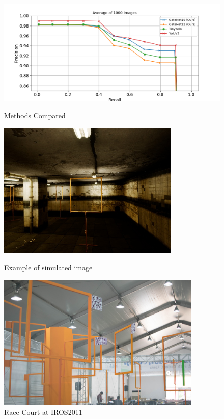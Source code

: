 \documentclass{beamer}
\begin{document}
\begin{frame}[fragile]
\begin{columns}[T]
\begin{column}{.66\textwidth}
\begin{figure}
	\centering
\includegraphics[width=\textwidth]{fig/pr}
\caption{Methods Compared}
\label{fig:pr}

		\begin{minipage}{0.4\textwidth}
		\centering
		\includegraphics[height=6.5cm]{fig/sim}
		\caption{Example of simulated image}
		\label{fig:sim}
	\end{minipage}
	\hfill
\begin{minipage}{0.5\textwidth}
	\centering
	\includegraphics[height=6.5cm]{fig/iros-pic11}
	\caption{Race Court at IROS2011}
	\label{fig:iros}
\end{minipage}
	
\hfill






\end{figure}
\end{column}
\end{columns}
\end{frame}
\end{document}
